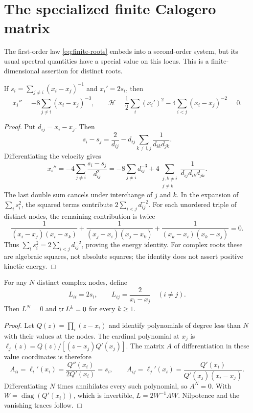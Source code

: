 \section{The specialized finite Calogero matrix}
\label{sec:calogero}

The first-order law \eqref{eq:finite-roots} embeds into a second-order
system, but its usual spectral quantities have a special value on this
locus. This is a finite-dimensional assertion for distinct roots.

\begin{proposition}
If $s_i=\sum_{j\ne i}(x_i-x_j)^{-1}$ and $x_i'=2s_i$, then
\begin{equation}
 x_i''=-8\sum_{j\ne i}(x_i-x_j)^{-3},\qquad
 \mathcal H=\frac12\sum_i(x_i')^2
             -4\sum_{i<j}(x_i-x_j)^{-2}=0.
 \label{eq:calogero-energy}
\end{equation}
\end{proposition}
\begin{proof}
Put $d_{ij}=x_i-x_j$. Then
\[
 s_i-s_j=\frac2{d_{ij}}
          -d_{ij}\sum_{k\ne i,j}\frac1{d_{ik}d_{jk}}.
\]
Differentiating the velocity gives
\[
 x_i''=-4\sum_{j\ne i}\frac{s_i-s_j}{d_{ij}^2}
       =-8\sum_{j\ne i}d_{ij}^{-3}
         +4\sum_{\substack{j,k\ne i\\j\ne k}}
                      \frac1{d_{ij}d_{ik}d_{jk}}.
\]
The last double sum cancels under interchange of $j$ and $k$.
In the expansion of $\sum_i s_i^2$, the squared terms contribute
$2\sum_{i<j}d_{ij}^{-2}$. For each unordered triple of distinct
nodes, the remaining contribution is twice
\[
 \frac1{(x_i-x_j)(x_i-x_k)}
 +\frac1{(x_j-x_i)(x_j-x_k)}
 +\frac1{(x_k-x_i)(x_k-x_j)}=0.
\]
Thus $\sum_i s_i^2=2\sum_{i<j}d_{ij}^{-2}$, proving the energy
identity. For complex roots these are algebraic squares, not absolute
squares; the identity does not assert positive kinetic energy.
\end{proof}

\begin{theorem}
\label{thm:nilpotence}
For any $N$ distinct complex nodes, define
\begin{equation}
 L_{ii}=2s_i,\qquad L_{ij}=\frac2{x_i-x_j}\quad(i\ne j).
 \label{eq:L}
\end{equation}
Then $L^N=0$ and $\operatorname{tr} L^k=0$ for every $k\ge1$.
\end{theorem}
\begin{proof}
Let $Q(z)=\prod_i(z-x_i)$ and identify polynomials of degree less
than $N$ with their values at the nodes. The cardinal polynomial at
$x_j$ is $\ell_j(z)=Q(z)/[(z-x_j)Q'(x_j)]$. The matrix $A$ of
differentiation in these value coordinates is therefore
\[
 A_{ii}=\ell_i'(x_i)=\frac{Q''(x_i)}{2Q'(x_i)}=s_i,
 \qquad
 A_{ij}=\ell_j'(x_i)=\frac{Q'(x_i)}{Q'(x_j)(x_i-x_j)}.
\]
Differentiating $N$ times annihilates every such polynomial, so
$A^N=0$. With $W=\operatorname{diag}(Q'(x_i))$, which is invertible,
$L=2W^{-1}AW$. Nilpotence and the vanishing traces follow.
\end{proof}

